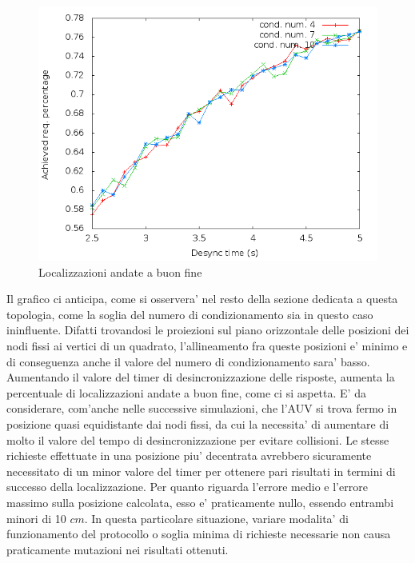 \begin{figure}[H]
    \centering
    \includegraphics[scale=0.5]{squaresimulation/achievedlocpreempt0drop0speed0.png}
    \caption{Localizzazioni andate a buon fine}
    \label{fig:squaresimulation/achievedlocpreempt0drop0speed0}
\end{figure}

Il grafico ci anticipa, come si osservera' nel resto della sezione dedicata a questa topologia, come la soglia del numero di condizionamento sia in questo caso ininfluente. Difatti trovandosi le proiezioni sul piano orizzontale delle posizioni dei nodi fissi ai vertici di un quadrato, l'allineamento fra queste posizioni e' minimo e di conseguenza anche il valore del numero di condizionamento sara' basso. Aumentando il valore del timer di desincronizzazione delle risposte, aumenta la percentuale di localizzazioni andate a buon fine, come ci si aspetta. E' da considerare, com'anche nelle successive simulazioni, che l'AUV si trova fermo in posizione quasi equidistante dai nodi fissi, da cui la necessita' di aumentare di molto il valore del tempo di desincronizzazione per evitare collisioni. Le stesse richieste effettuate in una posizione piu' decentrata avrebbero sicuramente necessitato di un minor valore del timer per ottenere pari risultati in termini di successo della localizzazione.
Per quanto riguarda l'errore medio e l'errore massimo sulla posizione calcolata, esso e' praticamente nullo, essendo entrambi minori di 10 $cm$.
In questa particolare situazione, variare modalita' di funzionamento del protocollo o soglia minima di richieste necessarie non causa praticamente mutazioni nei risultati ottenuti.

